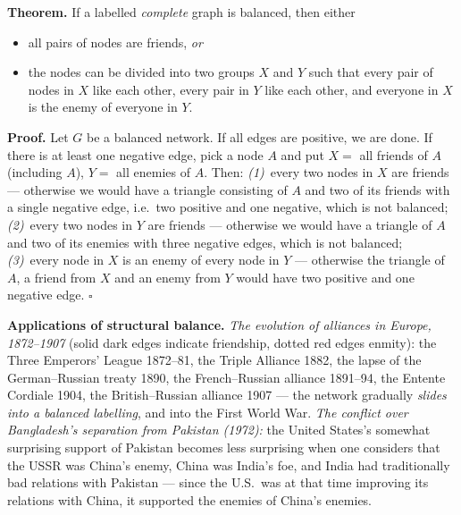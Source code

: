 \documentclass[11pt,a4paper]{article}
\theoremstyle{definition}
\begin{document}
\begin{defbox}
\textbf{Theorem.} If a labelled \emph{complete} graph is balanced, then either
\begin{itemize}
\item all pairs of nodes are friends, \emph{or}
\item the nodes can be divided into two groups $X$ and $Y$ such that every pair of nodes in $X$ like
      each other, every pair in $Y$ like each other, and everyone in $X$ is the enemy of everyone in
      $Y$.
\end{itemize}

\textbf{Proof.} Let $G$ be a balanced network. If all edges are positive, we are done. If there is at
least one negative edge, pick a node $A$ and put $X=$ all friends of $A$ (including $A$), $Y=$ all
enemies of $A$. Then: \emph{(1)}~every two nodes in $X$ are friends --- otherwise we would have a
triangle consisting of $A$ and two of its friends with a single negative edge, i.e.\ two positive and
one negative, which is not balanced; \emph{(2)}~every two nodes in $Y$ are friends --- otherwise we
would have a triangle of $A$ and two of its enemies with three negative edges, which is not balanced;
\emph{(3)}~every node in $X$ is an enemy of every node in $Y$ --- otherwise the triangle of $A$, a
friend from $X$ and an enemy from $Y$ would have two positive and one negative edge. $\square$
\end{defbox}

\textbf{Applications of structural balance.} \emph{The evolution of alliances in Europe, 1872--1907}
(solid dark edges indicate friendship, dotted red edges enmity): the Three Emperors' League
1872--81, the Triple Alliance 1882, the lapse of the German--Russian treaty 1890, the
French--Russian alliance 1891--94, the Entente Cordiale 1904, the British--Russian alliance 1907 ---
the network gradually \emph{slides into a balanced labelling}, and into the First World War.
\emph{The conflict over Bangladesh's separation from Pakistan (1972):} the United States's somewhat
surprising support of Pakistan becomes less surprising when one considers that the USSR was China's
enemy, China was India's foe, and India had traditionally bad relations with Pakistan --- since the
U.S.\ was at that time improving its relations with China, it supported the enemies of China's
enemies.
\end{document}
